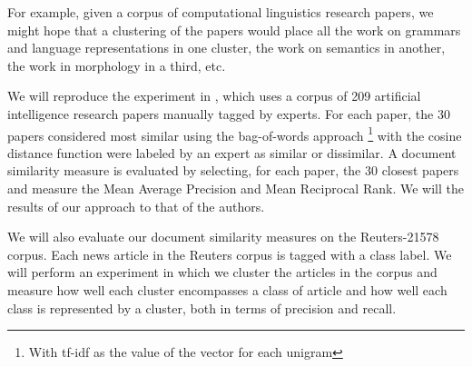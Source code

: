 \documentclass[11pt]{article}
\begin{document}
\pgfplotsset{width=10cm}
\begin{figure}[H]
\centering
{}
\end{figure}



 


For example, given a corpus of computational linguistics research papers, we might hope that a clustering of the papers would place all the work on grammars and language representations in one cluster, the work on semantics in another, the work in morphology in a third, etc. 

We will reproduce the experiment in \cite{Hurtado2013},  which uses a corpus of 209 artificial intelligence research papers manually tagged by experts. For each paper, the 30 papers considered most similar using the bag-of-words approach \footnote{With tf-idf as the value of the vector for each unigram} with  the cosine distance function were labeled by an expert as similar or dissimilar. A document similarity measure is evaluated by selecting, for each paper, the 30 closest papers and measure the Mean Average Precision and Mean Reciprocal Rank. We will the results of our approach to that of the authors. 

We will also evaluate our document similarity measures on the Reuters-21578 corpus. Each news article in the Reuters corpus is tagged with a class label. We will perform an experiment in which we cluster the articles in the corpus and measure how well each cluster encompasses a class of article and how well each class is represented by a cluster, both in terms of precision and recall. 
\end{document}
